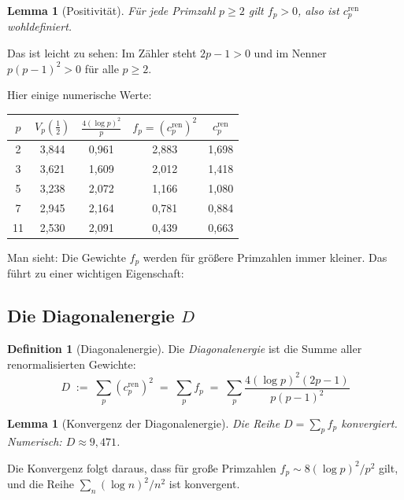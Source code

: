 \documentclass[11pt,a4paper]{article}
\theoremstyle{plain}
\newtheorem{lemma}[theorem]{Lemma}
\theoremstyle{definition}
\newtheorem{definition}[theorem]{Definition}
\theoremstyle{remark}
\newcommand{\cren}{c_p^{\mathrm{ren}}}
\begin{document}
	\begin{lemma}[Positivit\"at]
		F\"ur jede Primzahl $p \geq 2$ gilt $f_p > 0$, also ist $\cren$ wohldefiniert.
	\end{lemma}
	
	Das ist leicht zu sehen: Im Z\"ahler steht $2p - 1 > 0$ und im Nenner
	$p(p-1)^2 > 0$ f\"ur alle $p \geq 2$.
	
	Hier einige numerische Werte:
	
	\begin{center}
		\begin{tabular}{ccccc}
			\toprule
			$p$ & $V_p(\frac{1}{2})$ & $\frac{4(\log p)^2}{p}$ & $f_p = (\cren)^2$ & $\cren$ \\
			\midrule
			2  & 3{,}844 & 0{,}961 & 2{,}883 & 1{,}698 \\
			3  & 3{,}621 & 1{,}609 & 2{,}012 & 1{,}418 \\
			5  & 3{,}238 & 2{,}072 & 1{,}166 & 1{,}080 \\
			7  & 2{,}945 & 2{,}164 & 0{,}781 & 0{,}884 \\
			11 & 2{,}530 & 2{,}091 & 0{,}439 & 0{,}663 \\
			\bottomrule
		\end{tabular}
	\end{center}
	
	Man sieht: Die Gewichte $f_p$ werden f\"ur gr\"o\ss ere Primzahlen immer kleiner.
	Das f\"uhrt zu einer wichtigen Eigenschaft:
	
	\subsection{Die Diagonalenergie $D$}
	
	\begin{definition}[Diagonalenergie]
		Die \emph{Diagonalenergie} ist die Summe aller renormalisierten Gewichte:
		\begin{equation}
			D \;:=\; \sum_p (\cren)^2 \;=\; \sum_p f_p
			\;=\; \sum_p \frac{4(\log p)^2(2p-1)}{p(p-1)^2}
		\end{equation}
	\end{definition}
	
	\begin{lemma}[Konvergenz der Diagonalenergie]
		Die Reihe $D = \sum_p f_p$ konvergiert. Numerisch: $D \approx 9{,}471$.
	\end{lemma}
	
	Die Konvergenz folgt daraus, dass f\"ur gro\ss e Primzahlen
	$f_p \sim 8(\log p)^2/p^2$ gilt, und die Reihe $\sum_n (\log n)^2/n^2$
	ist konvergent.
	
\end{document}
